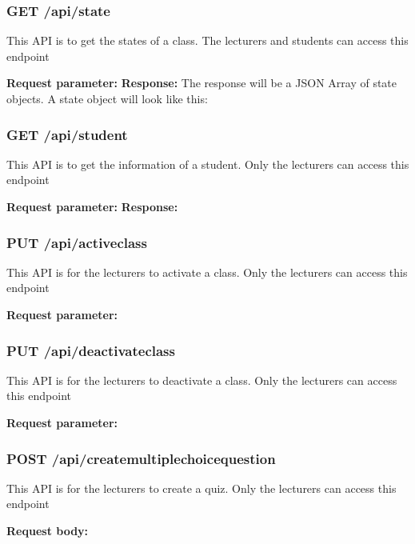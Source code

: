 \documentclass[a4paper, 11pt,openany]{book} %
\begin{document}
\subsubsection{GET /api/state}
This API is to get the states of a class. The lecturers and students can access this endpoint\par
\textbf{Request parameter:}
\textbf{Response:}
The response will be a JSON Array of state objects. A state object will look like this:
\subsubsection{GET /api/student}
This API is to get the information of a student. Only the lecturers can access this endpoint\par
\textbf{Request parameter:}
\textbf{Response:}
\subsubsection{PUT /api/activeclass}
This API is for the lecturers to activate a class. Only the lecturers can access this endpoint\par
\textbf{Request parameter:}

\subsubsection{PUT /api/deactivateclass}
This API is for the lecturers to deactivate a class. Only the lecturers can access this endpoint\par
\textbf{Request parameter:}

\subsubsection{POST /api/createmultiplechoicequestion}
This API is for the lecturers to create a quiz. Only the lecturers can access this endpoint\par
\textbf{Request body:}
\end{document}
